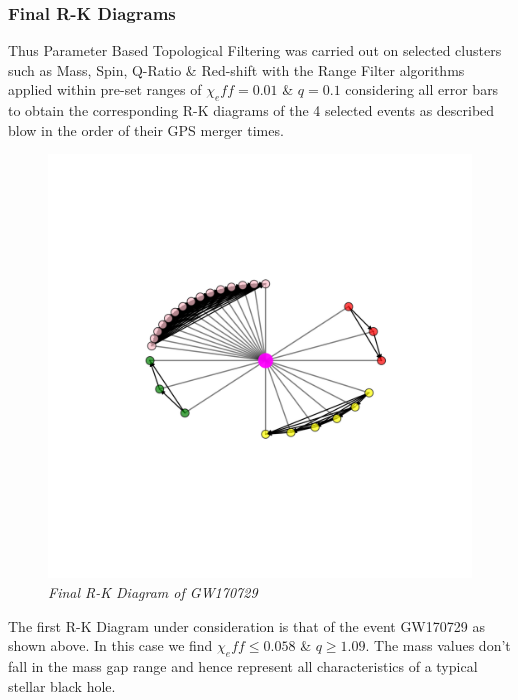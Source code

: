 \subsubsection{Final R-K Diagrams}
    
    
Thus Parameter Based Topological Filtering was carried out on selected clusters such as Mass, Spin, Q-Ratio \& Red-shift with the Range Filter algorithms applied within pre-set ranges of $\chi_eff=0.01$ \&  $q=0.1$  \cite{24.7_qvalueestimation} \cite{24.9_EffectiveSpin} \cite{00.6_LIGOAnalysisPipeline}considering all error bars to obtain the corresponding R-K diagrams of the 4 selected events as described blow in the order of their GPS merger times.

    \begin{figure}[H]
        \centering
        \includegraphics[width=1.0\linewidth]{images/GW170729_RK_Diagram.png}
        \caption{\textit{Final R-K Diagram of GW170729}}
        \label{fig:LIGO14_PlaceHolder1_fig}
    \end{figure}

The first R-K Diagram under consideration is that of the event GW170729 as shown above. In this case we find $\chi_eff \le 0.058$ \&  $q\ge 1.09$. The mass values don't fall in the mass gap range and hence represent all characteristics of a typical stellar black hole.


